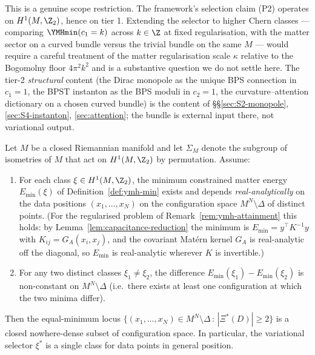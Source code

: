 \begin{remark}
This is a genuine scope restriction. The framework's selection
claim (P2) operates on $H^1(M,\Z_2)$, hence on tier 1. Extending
the selector to higher Chern classes --- comparing
$\YMHmin(c_1=k)$ across $k\in\Z$ at fixed regularisation, with the
matter sector on a curved bundle versus the trivial bundle on the
same $M$ --- would require a careful treatment of the matter
regularisation scale $\kappa$ relative to the Bogomolny floor
$4\pi^2 k^2$ and is a substantive question we do not settle here.
The tier-2 \emph{structural} content (the Dirac monopole as the
unique BPS connection in $c_1=1$, the BPST instanton as the BPS
moduli in $c_2=1$, the curvature--attention dictionary on a chosen
curved bundle) is the content of \S\S\ref{sec:S2-monopole},
\ref{sec:S4-instanton}, \ref{sec:attention}; the bundle is
external input there, not variational output.
\end{remark}

\begin{proposition}\label{prop:generic-uniqueness}
Let $M$ be a closed Riemannian manifold and let $\Sigma_M$ denote the
subgroup of isometries of $M$ that act on $H^1(M,\Z_2)$ by
permutation. Assume:
\begin{enumerate}[label=(\alph*),leftmargin=2em]
\item For each class $\xi\in H^1(M,\Z_2)$, the minimum constrained
matter energy $E_{\min}(\xi)$ of Definition~\ref{def:ymh-min} exists
and depends \emph{real-analytically} on the data positions
$(x_1,\dots,x_N)$ on the configuration space $M^N\setminus\Delta$ of
distinct points. (For the regularised problem of
Remark~\ref{rem:ymh-attainment} this holds: by
Lemma~\ref{lem:capacitance-reduction} the minimum is
$E_{\min}=y^\top K^{-1}y$ with $K_{ij}=G_A(x_i,x_j)$, and the
covariant Matérn kernel $G_A$ is real-analytic off the diagonal, so
$E_{\min}$ is real-analytic wherever $K$ is invertible.)
\item For any two distinct classes $\xi_1\neq\xi_2$, the difference
$E_{\min}(\xi_1)-E_{\min}(\xi_2)$ is non-constant on
$M^N\setminus\Delta$ (i.e.\ there exists at least one configuration
at which the two minima differ).
\end{enumerate}
Then the equal-minimum locus
$\{(x_1,\dots,x_N)\in M^N\setminus\Delta\,:\,
|\Xi^*(D)|\geq 2\}$ is a closed nowhere-dense subset of
configuration space. In particular, the variational selector
$\xi^*$ is a single class for data points in general position.
\end{proposition}

